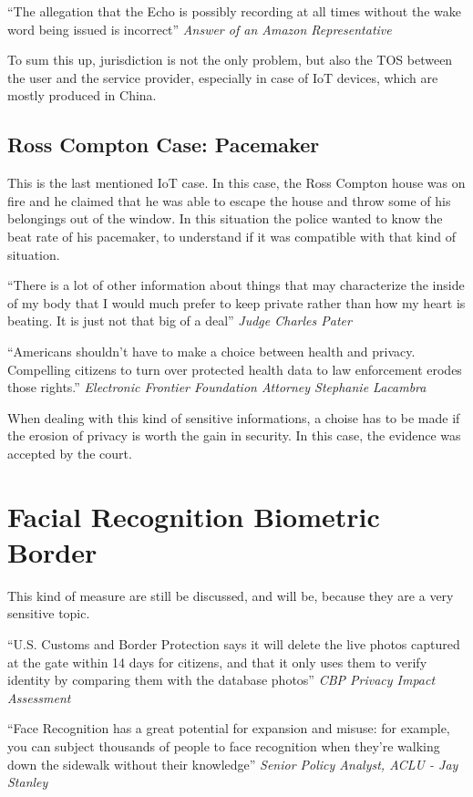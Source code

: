 “The allegation that the Echo is possibly recording at all times
without the wake word being issued is incorrect”  
\textit{Answer of an Amazon Representative}

To sum this up, jurisdiction is not the only problem, but also the TOS
between the user and the service provider, especially in case of IoT
devices, which are mostly produced in China.

\subsection{Ross Compton Case: Pacemaker}

This is the last mentioned IoT case. In this case, the Ross Compton
house was on fire and he claimed that he was able to escape the house 
and throw some of his belongings out of the window. In this situation
the police wanted to know the beat rate of his pacemaker, to
understand if it was compatible with that kind of situation.

“There is a lot of other information about things that may
characterize the inside of my body that I would much prefer to keep
private rather than how my heart is beating. It is just not that big
of a deal”  \textit{Judge Charles Pater}

“Americans shouldn't have to make a choice between health and privacy.
Compelling citizens to turn over protected health data to law
enforcement erodes those rights.”  \textit{Electronic Frontier
Foundation Attorney Stephanie Lacambra}

When dealing with this kind of sensitive informations, a choise has to
be made if the erosion of privacy is worth the gain in security.
In this case, the evidence was accepted by the court.
\section{Facial Recognition Biometric Border}
This kind of measure are still be discussed, and will be, because they
are a very sensitive topic.

“U.S. Customs and Border Protection says it will delete the live
photos captured at the gate within 14 days for citizens, and that it
only uses them to verify identity by comparing them with the database
photos”  \textit{CBP Privacy Impact Assessment}

“Face Recognition has a great potential for expansion and misuse: for
example, you can subject thousands of people to face recognition when
they’re walking down the sidewalk without their knowledge”
\textit{Senior Policy Analyst, ACLU - Jay Stanley}

